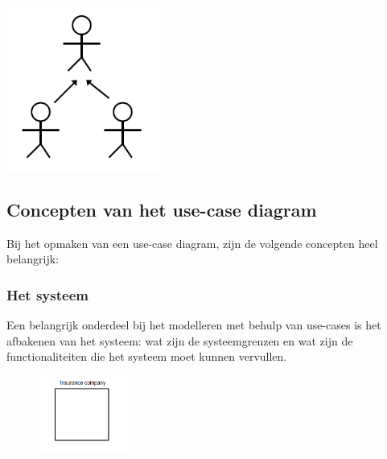 
\begin{center}
\includegraphics[width=2in]{img/genact}%
\end{center}

\subsection{Concepten van het use-case diagram}

Bij het opmaken van een use-case diagram, zijn de volgende concepten heel belangrijk:

\subsubsection{Het systeem}

Een belangrijk onderdeel bij het modelleren met behulp van use-cases is het afbakenen van het systeem: wat zijn de systeemgrenzen en wat zijn de functionaliteiten die het systeem moet kunnen vervullen.

\begin{figure}
  \begin{center}
    \includegraphics[width=0.28\textwidth]{img/scope}
  \end{center}
\end{figure}

